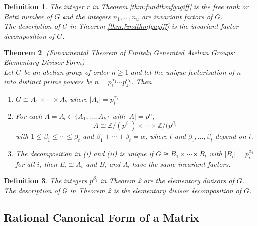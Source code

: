 \documentclass[a4paper,8pt]{article}
\newcommand{\Z}{\mathbb{Z}}
\newcommand{\abs}[1]{\left\lvert#1\right\rvert}
\newcommand{\hlt}[1]{\textit{{\color{blue}#1}}}
\theoremstyle{theorem}
\newtheorem{theorem}{Theorem}[subsection]
\newtheorem{definition}[theorem]{Definition}
\begin{document}
\begin{definition}
The integer $r$ in Theorem \ref{thm:fundthmfgagiff} is the \hlt{free rank} or \hlt{Betti number of $G$} and the integers $n_1, \ldots, n_u$ are \hlt{invariant factors of $G$}.\\
The description of $G$ in Theorem \ref{thm:fundthmfgagiff} is the \hlt{invariant factor decomposition of $G$}.
\end{definition}

\begin{theorem}
\label{thm:fundthmfgagedf}
\hlt{(Fundamental Theorem of Finitely Generated Abelian Groups: Elementary Divisor Form)}\\
Let $G$ be an abelian group of order $n \geq 1$ and let the unique factorisation of $n$ into distinct prime powers be $n=p_1^{\alpha_1} \cdots p_k^{\alpha_k}$. Then
\begin{enumerate}[label=(\roman*)]
\item $G \cong A_1 \times \cdots \times A_k$ where $\abs{A_i} = p_i^{\alpha_i}$
\item For each $A = A_i \in \{A_1, \ldots, A_k \}$ with $\abs{A} = p^{\alpha}$,
\begin{equation}
A \cong \Z/(p^{\beta_1}) \times \cdots \times \Z/(p^{\beta_t} \nonumber
\end{equation}
with $1 \leq \beta_1 \leq \cdots \leq \beta_t$ and $\beta_1 + \cdots + \beta_t = \alpha$, where $t$ and $\beta_1, \ldots, \beta_t$ depend on $i$.
\item The decomposition in (i) and (ii) is unique if $G \cong B_1 \times \cdots \times B_t$ with $\abs{B_i} = p_i^{\alpha_i}$ for all $i$, then $B_i \cong A_i$ and $B_i$ and $A_i$ have the same invariant factors.
\end{enumerate}
\end{theorem}

\begin{definition}
The integers $p^{\beta_j}$ in Theorem \ref{thm:fundthmfgagedf} are the \hlt{elementary divisors of $G$}.\\
The description of $G$ in Theorem \ref{thm:fundthmfgagedf} is the \hlt{elementary divisor decomposition of $G$}.
\end{definition}

\subsection{Rational Canonical Form of a Matrix}
\end{document}
